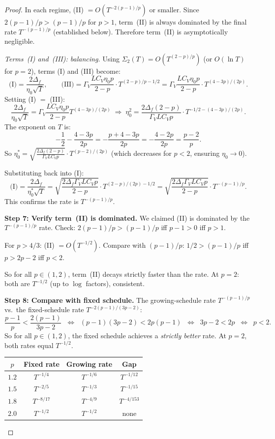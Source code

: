 \documentclass[11pt]{article}
\theoremstyle{definition}
\begin{document}
\begin{proof}
In each regime, (II) $= O(T^{-2(p-1)/p})$ or smaller.
Since $2(p-1)/p > (p-1)/p$ for $p > 1$, term~(II) is always dominated by the
final rate $T^{-(p-1)/p}$ (established below). Therefore term~(II) is
asymptotically negligible.

\emph{Terms~(I) and~(III): balancing.}
Using $\Sigma_2(T) = O(T^{(2-p)/p})$ (or $O(\ln T)$ for $p = 2$),
terms (I) and (III) become:
\[
  \text{(I)} = \frac{2\Delta_f}{\eta_0\sqrt{T}}, \qquad
  \text{(III)} = \Gamma_V \frac{LC_V\eta_0 p}{2-p} \cdot T^{(2-p)/p - 1/2}
  = \Gamma_V \frac{LC_V\eta_0 p}{2-p} \cdot T^{(4-3p)/(2p)}.
\]
Setting (I) $=$ (III):
\[
  \frac{2\Delta_f}{\eta_0\sqrt{T}}
  = \Gamma_V \frac{LC_V\eta_0 p}{2-p} T^{(4-3p)/(2p)}
  \;\Longrightarrow\;
  \eta_0^2 = \frac{2\Delta_f(2-p)}{\Gamma_V LC_V p}
    \cdot T^{-1/2 - (4-3p)/(2p)}.
\]
The exponent on $T$ is:
\[
  -\frac{1}{2} - \frac{4-3p}{2p} = -\frac{p + 4 - 3p}{2p}
  = -\frac{4-2p}{2p} = \frac{p-2}{p}.
\]
So $\eta_0^* = \sqrt{\frac{2\Delta_f(2-p)}{\Gamma_V LC_V p}} \cdot T^{(p-2)/(2p)}$
(which decreases for $p < 2$, ensuring $\eta_0 \to 0$).

Substituting back into (I):
\[
  \text{(I)} = \frac{2\Delta_f}{\eta_0^*\sqrt{T}}
  = \sqrt{\frac{2\Delta_f \Gamma_V LC_V p}{2-p}}
    \cdot T^{(2-p)/(2p) - 1/2}
  = \sqrt{\frac{2\Delta_f \Gamma_V LC_V p}{2-p}}
    \cdot T^{-(p-1)/p}.
\]
This confirms the rate is $T^{-(p-1)/p}$.

\textbf{Step 7: Verify term~(II) is dominated.}
We claimed (II) is dominated by the $T^{-(p-1)/p}$ rate. Check:
$2(p-1)/p > (p-1)/p$ iff $p-1 > 0$ iff $p > 1$. \checkmark

For $p > 4/3$: (II) $= O(T^{-1/2})$. Compare with $(p-1)/p$:
$1/2 > (p-1)/p$ iff $p > 2p-2$ iff $p < 2$. \checkmark

So for all $p \in (1, 2)$, term~(II) decays strictly faster than the rate.
At $p = 2$: both are $T^{-1/2}$ (up to $\log$ factors), consistent.

\textbf{Step 8: Compare with fixed schedule.}
The growing-schedule rate $T^{-(p-1)/p}$ vs.\ the fixed-schedule rate
$T^{-2(p-1)/(3p-2)}$:
\[
  \frac{p-1}{p} < \frac{2(p-1)}{3p-2}
  \;\;\Longleftrightarrow\;\;
  (p-1)(3p-2) < 2p(p-1)
  \;\;\Longleftrightarrow\;\;
  3p - 2 < 2p
  \;\;\Longleftrightarrow\;\;
  p < 2.
\]
So for all $p \in (1, 2)$, the fixed schedule achieves a \emph{strictly better}
rate. At $p = 2$, both rates equal $T^{-1/2}$.

\begin{center}
\renewcommand{\arraystretch}{1.2}
\begin{tabular}{cccc}
\toprule
$p$ & Fixed rate & Growing rate & Gap \\
\midrule
$1.2$ & $T^{-1/4}$ & $T^{-1/6}$ & $T^{-1/12}$ \\
$1.5$ & $T^{-2/5}$ & $T^{-1/3}$ & $T^{-1/15}$ \\
$1.8$ & $T^{-8/17}$ & $T^{-4/9}$ & $T^{-4/153}$ \\
$2.0$ & $T^{-1/2}$ & $T^{-1/2}$ & none \\
\bottomrule
\end{tabular}
\end{center}


\end{proof}
\end{document}
